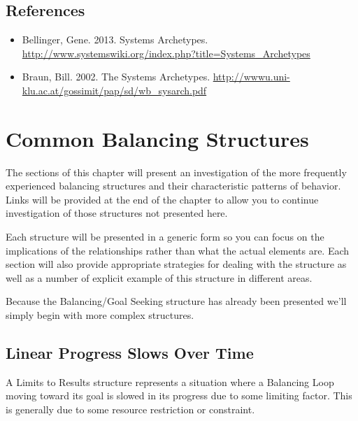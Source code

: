 \documentclass[]{memoir}
\begin{document}
\section{References}

\begin{itemize}
\itemsep1pt\parskip0pt
\item
  Bellinger, Gene. 2013. Systems Archetypes.
  \url{http://www.systemswiki.org/index.php?title=Systems_Archetypes}
\item
  Braun, Bill. 2002. The Systems Archetypes.
  \url{http://wwwu.uni-klu.ac.at/gossimit/pap/sd/wb_sysarch.pdf}
\end{itemize}

\chapter{Common Balancing Structures}

The sections of this chapter will present an investigation of the more
frequently experienced balancing structures and their characteristic
patterns of behavior. Links will be provided at the end of the chapter
to allow you to continue investigation of those structures not presented
here.

Each structure will be presented in a generic form so you can focus on
the implications of the relationships rather than what the actual
elements are. Each section will also provide appropriate strategies for
dealing with the structure as well as a number of explicit example of
this structure in different areas.

Because the Balancing/Goal Seeking structure has already been presented
we'll simply begin with more complex structures.

\section{Linear Progress Slows Over Time}

A Limits to Results structure represents a situation where a Balancing
Loop moving toward its goal is slowed in its progress due to some
limiting factor. This is generally due to some resource restriction or
constraint.

\FloatBarrier 
\end{document}
